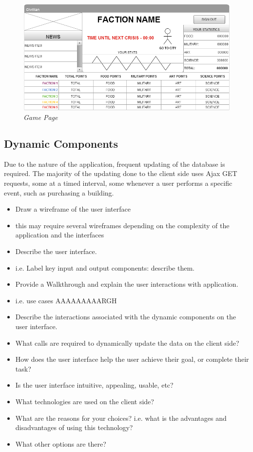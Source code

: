 \documentclass{sig-alt-release2}
\begin{document}
\begin{figure}[!htbp]
  \caption{\textit{Game Page}}
  \begin{center}
		\includegraphics[scale=0.25]{img/w4.png}
  \end{center}
\end{figure}

\subsection{Dynamic Components}
Due to the nature of the application, frequent updating of the database is required. The majority of the updating done to the client side uses Ajax GET requests, some at a timed interval, some whenever a user performs a specific event, such as purchasing a building.

\begin{itemize}

\item	Draw a wireframe of the user interface 
\item	this may require several wireframes depending on the complexity of the application and the interfaces

\item	Describe the user interface.
\item	i.e. Label key input and output components: describe them.

\item	Provide a Walkthrough and explain the user interactions with application. 
\item	i.e. use cases AAAAAAAAARGH

\item	Describe the interactions associated with the dynamic components on the user interface.
\item	What calls are required to dynamically update the data on the client side?
\item	How does the user interface help the user achieve their goal, or complete their task? 

\item	Is the user interface intuitive, appealing, usable, etc?

\item	What technologies are used on the client side? 
\item	What are the reasons for your choices? i.e. what is the advantages and disadvantages of using this technology? 
\item	What other options are there? 

\end{itemize}
\end{document}
